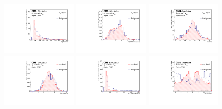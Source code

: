 \begin{figure}[htbp]
	\centering
	\includegraphics[width=0.32\textwidth]{6_Search/Figures/PlotsTechnics/FCNCtop_MZuttoppairuuu_norm}
	\includegraphics[width=0.32\textwidth]{6_Search/Figures/PlotsTechnics/dRZcZuttoppairuuu_norm}
	\includegraphics[width=0.32\textwidth]{6_Search/Figures/PlotsTechnics/Zboson_MZuttoppairuuu_norm}
	\includegraphics[width=0.32\textwidth]{6_Search/Figures/PlotsTechnics/SMtopetaZuttoppairuuu_norm}
	\includegraphics[width=0.32\textwidth]{6_Search/Figures/PlotsTechnics/mlbZuttoppairuuu_norm}
	\includegraphics[width=0.32\textwidth]{6_Search/Figures/PlotsTechnics/dPhiWlepbZuttoppairuuu_norm}

\end{figure}
